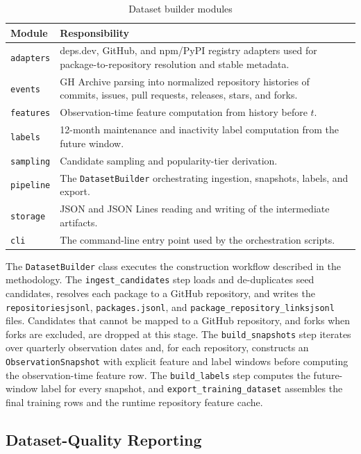 \begin{table}[htbp]
\centering
\caption{Dataset builder modules}
\label{tab:impl-dataset-modules}
\begin{tabular}{p{} p{}}
\hline
\textbf{Module} & \textbf{Responsibility} \\
\hline
\texttt{adapters} & deps.dev, GitHub, and npm/PyPI registry adapters used for package-to-repository resolution and stable metadata. \\
\texttt{events} & GH Archive parsing into normalized repository histories of commits, issues, pull requests, releases, stars, and forks. \\
\texttt{features} & Observation-time feature computation from history before \(t\). \\
\texttt{labels} & 12-month maintenance and inactivity label computation from the future window. \\
\texttt{sampling} & Candidate sampling and popularity-tier derivation. \\
\texttt{pipeline} & The \texttt{DatasetBuilder} orchestrating ingestion, snapshots, labels, and export. \\
\texttt{storage} & JSON and JSON Lines reading and writing of the intermediate artifacts. \\
\texttt{cli} & The command-line entry point used by the orchestration scripts. \\
\hline
\end{tabular}
\end{table}

The \texttt{DatasetBuilder} class executes the construction workflow described in the methodology. The \texttt{ingest\_candidates} step loads and de-duplicates seed candidates, resolves each package to a GitHub repository, and writes the \texttt{repositories\sdot jsonl}, \texttt{packages.jsonl}, and \texttt{package\_repository\_links\sdot jsonl} files. Candidates that cannot be mapped to a GitHub repository, and forks when forks are excluded, are dropped at this stage. The \texttt{build\_snapshots} step iterates over quarterly observation dates and, for each repository, constructs an \texttt{ObservationSnapshot} with explicit feature and label windows before computing the observation-time feature row. The \texttt{build\_labels} step computes the future-window label for every snapshot, and \texttt{export\_training\_dataset} assembles the final training rows and the runtime repository feature cache.

\subsection{Dataset-Quality Reporting}
\label{sec:impl-dataset-quality}

